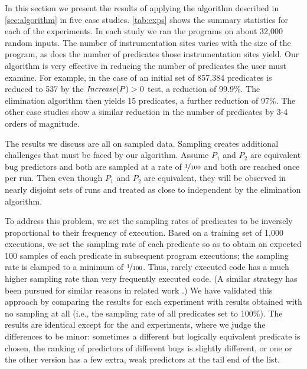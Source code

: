 


In this section we present the results of applying the algorithm
described in \autoref{sec:algorithm} in five case
studies.  \autoref{tab:exps} shows the summary statistics for each of the
experiments.  In each study we ran the programs on about 32,000 random
inputs.  The number of instrumentation sites varies with the size of
the program, as does the number of predicates those instrumentation
sites yield.  Our algorithm is very effective in reducing the number
of predicates the user must examine.  For example, in the case of
\rhythmbox an initial set of 857,384 predicates is reduced to 537 by the $\textit{Increase}(P) > 0$
test, a reduction of 99.9\%.  The elimination algorithm then yields 15 predicates, a further
reduction of 97\%.  The other case studies show a similar reduction in the number of
predicates by 3-4 orders of magnitude.

The results we discuss are all on sampled data.  Sampling creates
additional challenges that must be faced by our algorithm.  Assume $P_1$ and $P_2$ are
equivalent bug predictors and both are sampled at a rate of
$\nicefrac{1}{100}$ and both are reached once per run.  Then even though
$P_1$ and $P_2$ are equivalent, they will be observed in nearly disjoint
sets of runs and treated as close to independent by the elimination
algorithm.

To address this problem, we set the sampling rates of predicates to be
inversely proportional to their frequency of execution.  Based on a
training set of 1,000 executions, we set the sampling rate of each predicate so 
as to obtain an expected 100 samples of each predicate in subsequent program 
executions; the sampling rate is clamped to a minimum of $\nicefrac{1}{100}$.  
Thus, rarely executed code has a
much higher sampling rate than very frequently executed code.  (A
similar strategy has been pursued for similar reasons in related work \cite{chil04}.)  We
have validated this approach by comparing the results for each
experiment with results obtained with no sampling at all (i.e., the
sampling rate of all predicates set to 100\%).  The results are
identical except for the \rhythmbox and \moss experiments, where we
judge the differences to be minor: sometimes a different but logically
equivalent predicate is chosen, the ranking of predictors of different
bugs is slightly different, or one or the other version has a few
extra, weak predictors at the tail end of the list.  

